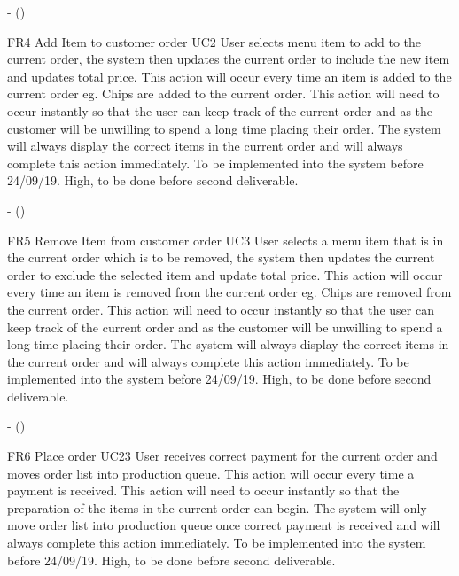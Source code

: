 \noindent \textbf{} -  ()\\
\begin{small}
	
\end{small}
\linebreak

FR4
Add Item to customer order
UC2
User selects menu item to add to the current order, the system then updates the current order to include the new item and updates total price. This action will occur every time an item is added to the current order eg. Chips are added to the current order. This action will need to occur instantly so that the user can keep track of the current order and as the customer will be unwilling to spend a long time placing their order. The system will always display the correct items in the current order and will always complete this action immediately. To be implemented into the system before 24/09/19.
High, to be done before second deliverable.

\noindent \textbf{} -  ()\\
\begin{small}
	
\end{small}
\linebreak

FR5
Remove Item from customer order
UC3
User selects a menu item that is in the current order which is to be removed,  the system then updates the current order to exclude the selected item and update total price. This action will occur every time an item is removed from  the current order eg. Chips are removed from  the current order. This action will need to occur instantly so that the user can keep track of the current order and as the customer will be unwilling to spend a long time placing their order. The system will always display the correct items in the current order and will always complete this action immediately. To be implemented into the system before 24/09/19.
High, to be done before second deliverable.

\noindent \textbf{} -  ()\\
\begin{small}
	
\end{small}
\linebreak

FR6
Place order
UC23
User receives correct payment for the current order and moves order list into production queue. This action will occur every time a payment is received. This action will need to occur instantly so that the preparation of the items in the current order can begin. The system will only move order list into production queue once correct payment is received and will always complete this action immediately. To be implemented into the system before 24/09/19.
High, to be done before second deliverable.

